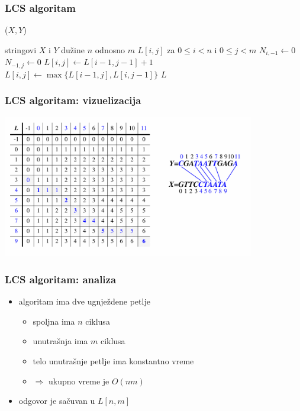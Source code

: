 \documentclass[compress]{beamer}
\begin{document}
\begin{frame}
  \frametitle{LCS algoritam}
  ($X,Y$)
  \begin{algorithmic}
    \REQUIRE stringovi $X$ i $Y$ dužine $n$ odnosno $m$
    \ENSURE $L[i,j]$ za $0\leq i<n$ i $0\leq j<m$
      \STATE $N_{i,-1} \leftarrow 0$
    \ENDFOR
      \STATE $N_{-1,j} \leftarrow 0$
    \ENDFOR
          \STATE $L[i,j] \leftarrow L[i-1,j-1]+1$
        \ELSE
          \STATE $L[i,j] \leftarrow \max\{L[i-1,j], L[i,j-1]\}$
        \ENDIF
      \ENDFOR
    \ENDFOR
    \RETURN $L$
  \end{algorithmic}    
\end{frame}

\begin{frame}[fragile]
  \frametitle{LCS algoritam: vizuelizacija}
  \begin{center}
    \includegraphics[width=11cm]{asp-13-pic11.png}
  \end{center}
\end{frame}

\begin{frame}[fragile]
  \frametitle{LCS algoritam: analiza}
  \begin{itemize}
    \item algoritam ima dve ugnježdene petlje
    \begin{itemize}
      \item spoljna ima $n$ ciklusa
      \item unutrašnja ima $m$ ciklusa
      \item telo unutrašnje petlje ima konstantno vreme
      \item $\Rightarrow$ ukupno vreme je $O(nm)$
    \end{itemize}
    \item odgovor je sačuvan u $L[n,m]$
  \end{itemize}
\end{frame}
\end{document}
